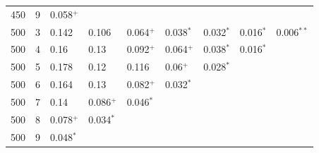 \documentclass[12pt,]{article}
\begin{document}
\begin{longtable}{rrlllllll}
450 & 9 & 0.058$^+$ &  &  &  &  &  & \\
500 & 3 & 0.142 & 0.106 & 0.064$^+$ & 0.038$^*$ & 0.032$^*$ & 0.016$^*$ & 0.006$^{**}$\\
500 & 4 & 0.16 & 0.13 & 0.092$^+$ & 0.064$^+$ & 0.038$^*$ & 0.016$^*$ & \\
500 & 5 & 0.178 & 0.12 & 0.116 & 0.06$^+$ & 0.028$^*$ &  & \\
500 & 6 & 0.164 & 0.13 & 0.082$^+$ & 0.032$^*$ &  &  & \\
500 & 7 & 0.14 & 0.086$^+$ & 0.046$^*$ &  &  &  & \\
500 & 8 & 0.078$^+$ & 0.034$^*$ &  &  &  &  & \\
500 & 9 & 0.048$^*$ &  &  &  &  &  & \\*
\end{longtable}

\clearpage
\end{document}
